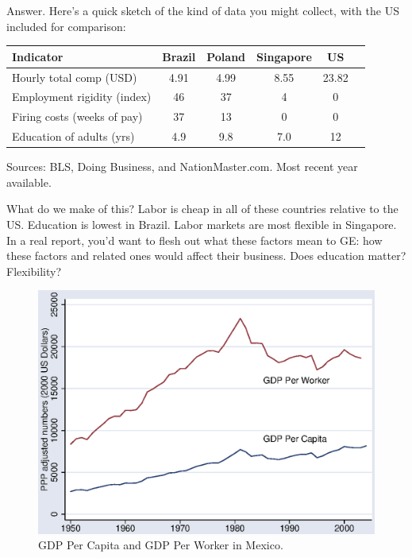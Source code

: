 \documentclass[letterpaper,12pt]{article}
\begin{document}
\begin{enumerate}
Answer.  Here's a quick sketch of the kind of data you
might collect, with the US included for comparison: 
% 
\begin{center}
\begin{tabular}{lccccc}
\hline\hline
Indicator   & Brazil & Poland & Singapore  &  US \\
\hline\hline 
Hourly total comp (USD) & 4.91 & 4.99   & 8.55  &  23.82  \\
Employment rigidity (index)    & 46   & 37   &  4  &  0  \\
Firing costs (weeks of pay) &  37   &  13   &  0  & 0  \\
Education of adults (yrs) &  4.9  &  9.8  & 7.0  &  12 \\
\hline\hline 
\end{tabular}
\end{center}
Sources:  BLS, Doing Business, and NationMaster.com.  
Most recent year available.   

What do we make of this?  
Labor is cheap in all of these countries relative to the US.  
Education is lowest in Brazil.
Labor markets are most flexible in Singapore. 
In a real report, you'd want to flesh out what these factors mean
to GE:  how these factors and related ones would affect their
business.  
Does education matter?  Flexibility?  
  


\begin{figure}[h]
    \centering
    \includegraphics[scale=0.8]{pwtmexypopyl.eps}
    \caption{GDP Per Capita and GDP Per Worker in Mexico.}
    \label{fig:mexico}
\end{figure}


\end{enumerate}
\end{document}
